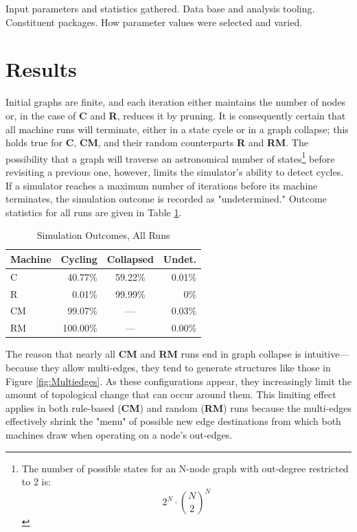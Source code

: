 \documentclass{tufte-handout}
\begin{document}
Input parameters and statistics gathered. Data base and analysis tooling.
Constituent packages. How parameter values were selected and varied.


\section{Results}

Initial graphs are finite, and each iteration
either maintains the number of nodes or, in the case of \textbf{C} and \textbf{R},
reduces it by pruning.  It is consequently certain that all machine runs will terminate,
either in a state cycle or in a graph collapse; this holds true
for \textbf{C}, \textbf{CM}, and their random counterparts \textbf{R} and \textbf{RM}.
The possibility that a graph will traverse an astronomical number
of states\footnote{The number of possible states for an N-node graph with
out-degree restricted to 2 is:
\[
2^N\cdot\binom{N}{2}^N
\]
}
before revisiting a previous one, however, limits the simulator's ability to
detect cycles. If a simulator reaches a maximum number of iterations
before its machine terminates, the simulation outcome is recorded as "undetermined."
Outcome statistics for all runs are given in Table \ref{tab:Tab1}.

\begin{table}
\caption{Simulation Outcomes, All Runs}
\centering
\begin{tabular}{lrcr}
\toprule
Machine & Cycling & Collapsed & Undet. \\
\midrule
C & 40.77\% & 59.22\% & 0.01\% \\
R & 0.01\% & 99.99\% & 0\% \\
\cmidrule(r){2-3}
CM & 99.07\% & --- & 0.03\% \\
RM & 100.00\% & --- & 0.00\% \\
\bottomrule
\end{tabular}
\label{tab:Tab1}
\end{table}
\vspace{3mm}
The reason that nearly all \textbf{CM} and \textbf{RM} runs end in graph collapse is
intuitive---because they allow multi-edges, they tend to generate structures
like those in Figure \ref{fig:Multiedges}. As these configurations appear, they increasingly limit the
amount of topological change that can occur around them. This limiting effect
applies in both rule-based (\textbf{CM}) and random (\textbf{RM}) runs because
the multi-edges effectively shrink the "menu" of possible new edge destinations from
which both machines draw when operating on a node's out-edges.
\end{document}
